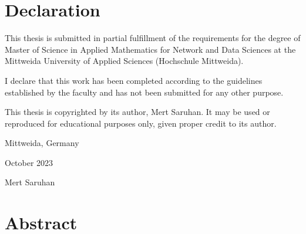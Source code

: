 \documentclass[12pt,twoside]{report}
\begin{document}
  \chapter*{\centering Declaration}
  \begin{spacing}{1.5}
    This thesis is submitted in partial fulfillment of the requirements for the degree of Master of Science in Applied Mathematics for Network and Data Sciences at the Mittweida University of Applied Sciences (Hochschule Mittweida).

  I declare that this work has been completed according to the guidelines established by the faculty and has not been submitted for any other purpose.

  This thesis is copyrighted by its author, Mert Saruhan. It may be used or reproduced for educational purposes only, given proper credit to its author.
  \vspace{15pt}

  \noindent Mittweida, Germany

   October 2023
  \vspace{10pt}

  \noindent Mert Saruhan
\end{spacing}

\chapter*{\centering Abstract}
\end{document}
